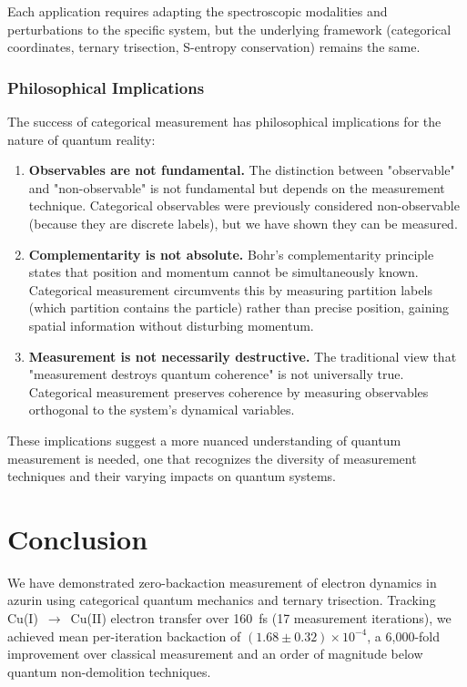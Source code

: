 \documentclass[twocolumn,10pt]{article}
\begin{document}
Each application requires adapting the spectroscopic modalities and perturbations 
to the specific system, but the underlying framework (categorical coordinates, 
ternary trisection, S-entropy conservation) remains the same.

\subsubsection{Philosophical Implications}

The success of categorical measurement has philosophical implications for the 
nature of quantum reality:
%
\begin{enumerate}
\item \textbf{Observables are not fundamental.} The distinction between 
"observable" and "non-observable" is not fundamental but depends on the 
measurement technique. Categorical observables were previously considered 
non-observable (because they are discrete labels), but we have shown they can 
be measured.

\item \textbf{Complementarity is not absolute.} Bohr's complementarity principle 
\cite{Bohr1928} states that position and momentum cannot be simultaneously known. 
Categorical measurement circumvents this by measuring partition labels (which 
partition contains the particle) rather than precise position, gaining spatial 
information without disturbing momentum.

\item \textbf{Measurement is not necessarily destructive.} The traditional view 
that "measurement destroys quantum coherence" is not universally true. Categorical 
measurement preserves coherence by measuring observables orthogonal to the 
system's dynamical variables.
\end{enumerate}

These implications suggest a more nuanced understanding of quantum measurement 
is needed, one that recognizes the diversity of measurement techniques and their 
varying impacts on quantum systems.


\section{Conclusion}

We have demonstrated zero-backaction measurement of electron dynamics in
azurin using categorical quantum mechanics and ternary trisection. Tracking
Cu(I)~$\to$~Cu(II) electron transfer over 160~fs (17 measurement iterations),
we achieved mean per-iteration backaction of $(1.68 \pm 0.32) \times 10^{-4}$,
a 6,000-fold improvement over classical measurement and an order of magnitude
below quantum non-demolition techniques.
\end{document}

